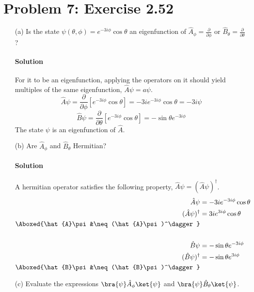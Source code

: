 \documentclass{article}
\begin{document}
\clearpage
	
	\section*{Problem 7: Exercise 2.52}
	\begin{enumerate}
		\item[(a)] Is the state $\psi\left( \theta, \phi \right) = e^{-3i\phi} \cos \theta$ an eigenfunction of $\hat{A}_\phi = \frac{\partial}{\partial \phi}$ or $\hat{B}_\theta = \frac{\partial}{\partial \theta}$?
		\paragraph{Solution} For it to be an eigenfunction, applying the operators on it should yield multiples of the same eigenfunction, $\hat{A}\psi = a\psi$.
		\[
			\hat{A}\psi = \frac{\partial}{\partial \phi}\left[ e^{-3i\phi} \cos \theta \right] = -3i e^{-3i\phi} \cos \theta = -3i \psi
		\]
		\[
			\hat{B}\psi = \frac{\partial}{\partial \theta}\left[ e^{-3i\phi} \cos \theta \right] = -\sin \theta e^{-3i\phi}
		\]
		The state $\psi$ is an eigenfunction of $\hat{A}$.
		
		\item[(b)] Are $\hat{A}_\phi$ and $\hat{B}_\theta$ Hermitian?
		\paragraph{Solution} A hermitian operator satisfies the following property, $\hat{A}\psi = (\hat{A}\psi)^\dagger$.
		\begin{align*}
			\hat{A}\psi &= -3i e^{-3i\phi} \cos \theta \\
			(\hat{A}\psi)^\dagger &= 3i e^{3i\phi} \cos \theta \\
			\Aboxed{\hat{A}\psi &\neq (\hat{A}\psi)^\dagger} \\\\
			\hat{B}\psi &= -\sin \theta e^{-3i\phi} \\
			(\hat{B}\psi)^\dagger &= -\sin \theta e^{3i\phi} \\
			\Aboxed{\hat{B}\psi &\neq (\hat{B}\psi)^\dagger}
		\end{align*}
		
		\item[(c)] Evaluate the expressions $ \bra{\psi}\hat{A}_\phi\ket{\psi} $ and $ \bra{\psi}\hat{B}_\theta\ket{\psi} $.

\end{enumerate}
\end{document}
